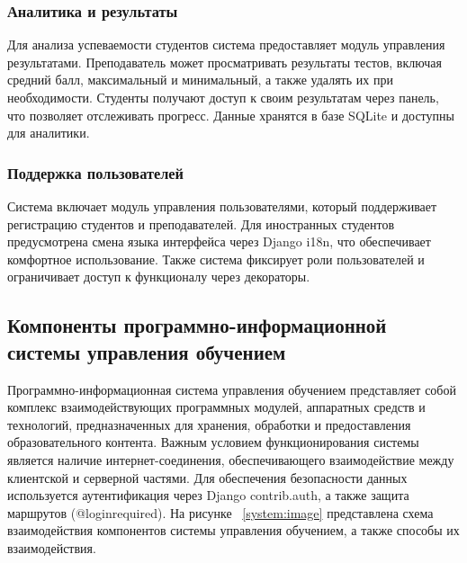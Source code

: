 \subsubsection{Аналитика и результаты}
Для анализа успеваемости студентов система предоставляет модуль управления результатами. Преподаватель может просматривать результаты тестов, включая средний балл, максимальный и минимальный, а также удалять их при необходимости. Студенты получают доступ к своим результатам через панель, что позволяет отслеживать прогресс. Данные хранятся в базе SQLite и доступны для аналитики. 

\subsubsection{Поддержка пользователей} 
Система включает модуль управления пользователями, который поддерживает регистрацию студентов и преподавателей. Для иностранных студентов предусмотрена смена языка интерфейса через Django i18n, что обеспечивает комфортное использование. Также система фиксирует роли пользователей и ограничивает доступ к функционалу через декораторы.


\subsection{Компоненты программно-информационной системы управления обучением}
Программно-информационная система управления обучением представляет собой комплекс взаимодействующих программных модулей, аппаратных средств и технологий, предназначенных для хранения, обработки и предоставления образовательного контента. Важным условием функционирования системы является наличие интернет-соединения, обеспечивающего взаимодействие между клиентской и серверной частями. Для обеспечения безопасности данных используется аутентификация через Django contrib.auth, а также защита маршрутов (@loginrequired). На рисунке ~\ref{system:image} представлена схема взаимодействия компонентов системы управления обучением, а также способы их взаимодействия. 

